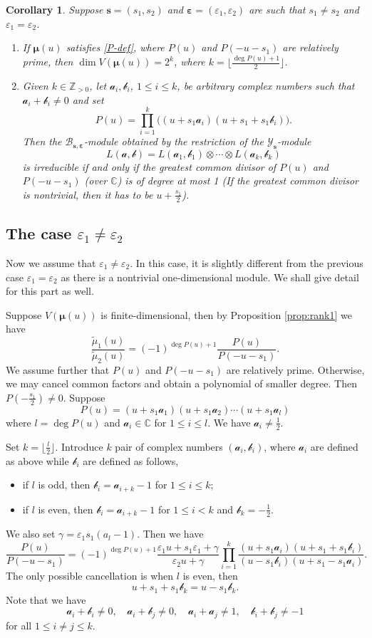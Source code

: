 \documentclass[11pt,reqno]{amsart}
\numberwithin{equation}{section}
\newtheorem{cor}[thm]{Corollary}
\theoremstyle{definition}
\theoremstyle{remark}
\newcommand{\beq}{\begin{equation}}
\newcommand{\eeq}{\end{equation}}
\newcommand{\C}{\mathbb{C}}
\newcommand{\mc}{\mathcal}
\newcommand{\bC}{\mathbb{C}}
\newcommand{\bZ}{\mathbb{Z}}
\newcommand{\tl}{\tilde}
\newcommand{\lle}{\leqslant}
\newcommand{\YMN}{{\mathscr{Y}_{\bm s}}}
\newcommand{\BMN}{{\mathscr{B}_{\bm s,\bm \ve}}}
\newcommand{\ve}{\varepsilon}
\newcommand{\s}{{\bm s}}
\begin{document}
\begin{cor}
Suppose $\s=(s_1,s_2)$ and $\bm \ve=(\ve_1,\ve_2)$ are such that $s_1\ne s_2$ and $\ve_1=\ve_2$.
\begin{enumerate}
    \item If $\bm\mu(u)$ satisfies \eqref{P-def}, where $P(u)$ and $P(-u-s_1)$ are relatively prime, then $\dim V(\bm\mu(u))=2^k$, where $k=\big\lfloor\frac{\deg P(u)+1}{2}\big\rfloor$.
    \item Given $k\in\bZ_{>0}$, let $\mc a_i,\mc b_i$, $1\lle i\lle k$, be arbitrary complex numbers such that $\mc a_i+\mc b_i\ne 0$ and set $$P(u)=\prod_{i=1}^k\big((u+s_1\mc a_i)(u+s_1+s_1\mc b_i)\big).$$ Then the $\BMN$-module obtained by the restriction of the $\YMN$-module
    \[
    L(\bm{\mc a,\mc b})=L(\mc a_1,\mc b_1)\otimes \cdots\otimes L(\mc a_k,\mc b_k)
    \]
    is irreducible if and only if the greatest common divisor of $P(u)$ and $P(-u-s_1)$ (over $\bC$) is of degree at most 1 (If the greatest common divisor is nontrivial, then it has to be $u+\frac{s_1}{2}$).
\end{enumerate}
\end{cor}

\subsection{The case $\ve_1\ne \ve_2$}
Now we assume that $\ve_1\ne \ve_2$. In this case, it is slightly different from the previous case $\ve_1=\ve_2$ as there is a nontrivial one-dimensional module. We shall give detail for this part as well.

Suppose $V(\bm\mu(u))$ is finite-dimensional, then by Proposition \ref{prop:rank1} we have
\beq\label{P-def2}
\frac{\tl \mu_1(u)}{\tl \mu_2(u)}=(-1)^{\deg P(u)+1}\frac{P(u)}{P(-u-s_1)}.
\eeq
We assume further that $P(u)$ and $P(-u-s_1)$ are relatively prime. Otherwise, we may cancel common factors and obtain a polynomial of smaller degree. Then $P(-\frac{s_1}{2})\ne 0$. Suppose
\[
P(u)=(u+s_1\mc a_1)(u+s_1\mc a_2)\cdots (u+s_1\mc a_{l})
\]
where $l=\deg P(u)$ and $\mc a_i\in\C$ for $1\lle i\lle l$. We have $\mc a_i\ne \frac{1}{2}$.

Set $k=\lfloor\frac{l}{2} \rfloor$. Introduce $k$ pair of complex numbers $(\mc a_i,\mc b_i)$, where $\mc a_i$ are defined as above while $\mc b_i$ are defined as follows,
\begin{itemize}
    \item if $l$ is odd, then $\mc b_i=\mc a_{i+k}-1$ for $1\lle i\lle k$;
    \item if $l$ is even, then $\mc b_i=\mc a_{i+k}-1$ for $1\lle i< k$ and $\mc b_k=-\frac{1}{2}$.
\end{itemize}
We also set $\gamma=\ve_1s_1(a_{l}-1)$. Then we have
\beq\label{P-factor2}
\frac{P(u)}{P(-u-s_1)}=(-1)^{\deg P(u)+1}\frac{\ve_1u+s_1\ve_1+\gamma}{\ve_2u+\gamma}\prod_{i=1}^k\frac{(u+s_1\mc a_i)(u+s_1+s_1\mc b_i)}{(u-s_1\mc b_i)(u+s_1-s_1\mc a_i)}.
\eeq
The only possible cancellation is when $l$ is even, then
\[
u+s_1+s_1\mc b_k=u-s_1\mc b_k.
\]
Note that we have
\beq\label{notequalto2}
\mc a_i+\mc b_i\ne 0,\quad \mc a_i+\mc b_j\ne 0, \quad \mc a_i+\mc a_j\ne 1,\quad \mc b_i+\mc b_j\ne -1
\eeq
for all $1\lle i\ne j\lle k$.
\end{document}

